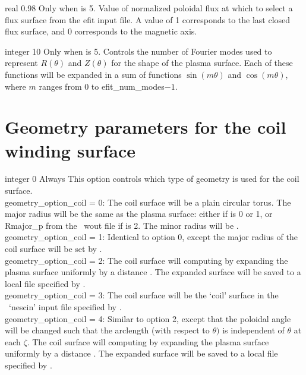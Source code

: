 \myhrule

{real}
{0.98}
{Only when  is 5.}
{Value of normalized poloidal flux at which to select a flux surface from the {\ttfamily efit} input file.
A value of 1 corresponds to the last closed flux surface, and 0 corresponds to the magnetic axis.}

\myhrule

{integer}
{10}
{Only when  is 5.}
{Controls the number of Fourier modes used to represent $R(\theta)$ and $Z(\theta)$ for the shape of
the plasma surface. Each of these functions will be expanded in a sum of functions $\sin(m\theta)$ and $\cos(m\theta)$,
where $m$ ranges from 0 to {\ttfamily efit\_num\_modes}$-1$.}

\section{Geometry parameters for the coil winding surface}

{integer}
{0}
{Always}
{This option controls which type of geometry is used for the coil surface.\\

{\ttfamily geometry\_option\_coil} = 0: The coil surface will be a plain circular torus. The major radius will be the 
same as the plasma surface: either  if  is 0 or 1, or {\ttfamily Rmajor\_p} from the \vmec~{\ttfamily wout} file
if   is 2.
     The minor radius will be .\\

{\ttfamily geometry\_option\_coil} = 1: Identical to option 0, except the major radius of the coil surface will be set by .\\

{\ttfamily geometry\_option\_coil} = 2: The coil surface will computing by expanding the plasma surface uniformly by a distance . The expanded surface will be saved to a local file specified by . \\

{\ttfamily geometry\_option\_coil} = 3: The coil surface will be the `coil' surface in the \nescoil~`nescin' input file specified by . \\

{\ttfamily geometry\_option\_coil} = 4: Similar to option 2, except that the poloidal angle will be changed such that the arclength (with respect to $\theta)$ is independent of $\theta$ at each $\zeta$. The coil surface will computing by expanding the plasma surface uniformly by a distance . The expanded surface will be saved to a local file specified by . \\
}


